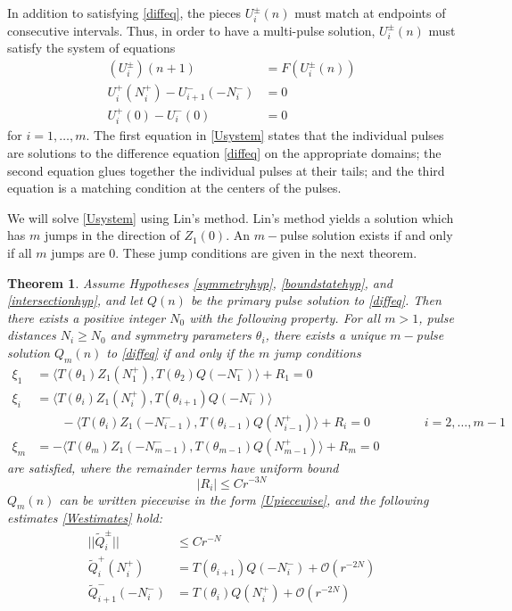 \documentclass[12pt]{article}
\newtheorem{theorem}{Theorem}
\begin{document}
In addition to satisfying \eqref{diffeq}, the pieces $U_i^\pm(n)$ must match at endpoints of consecutive intervals. Thus, in order to have a multi-pulse solution, $U_i^\pm(n)$ must satisfy the system of equations
\begin{equation}\label{Usystem}
\begin{aligned}
(U_i^\pm)(n+1) &= F(U_i^\pm(n))  \\
U_i^+(N_i^+) - U_{i+1}^-(-N_i^-) &= 0 \\
U_i^+(0) - U_i^-(0) &= 0
\end{aligned}
\end{equation}
for $i = 1, \dots, m$. The first equation in \eqref{Usystem} states that the individual pulses are solutions to the difference equation \eqref{diffeq} on the appropriate domains; the second equation glues together the individual pulses at their tails; and the third equation is a matching condition at the centers of the pulses.

We will solve \eqref{Usystem} using Lin's method. Lin's method yields a solution which has $m$ jumps in the direction of $Z_1(0)$. An $m-$pulse solution exists if and only if all $m$ jumps are 0. These jump conditions are given in the next theorem.

\begin{theorem}\label{ntmulti}
Assume Hypotheses \ref{symmetryhyp}, \ref{boundstatehyp}, and \ref{intersectionhyp}, and let $Q(n)$ be the primary pulse solution to \eqref{diffeq}. Then there exists a positive  integer $N_0$ with the following property. For all $m > 1$, pulse distances $N_i \geq N_0$ and symmetry parameters $\theta_i$, there exists a unique $m-$pulse solution $Q_m(n)$ to \eqref{diffeq} if and only if the $m$ jump conditions 
\begin{equation}\label{jumpcondexist}
\begin{aligned}
\xi_1 &= \langle T(\theta_1) Z_1(N_1^+), T(\theta_{2}) Q(-N_1^-) \rangle + R_1 = 0 \\
\xi_i &= \langle T(\theta_i) Z_1(N_i^+), T(\theta_{i+1}) Q(-N_i^-) \rangle \\
&\qquad-\langle T(\theta_i) Z_1(-N_{i-1}^-), T(\theta_{i-1}) Q(N_{i-1}^+) \rangle + R_i = 0 && \qquad i = 2, \dots, m-1 \\
\xi_m &= -\langle T(\theta_m) Z_1(-N_{m-1}^-), T(\theta_{m-1}) Q(N_{m-1}^+) \rangle + R_m = 0
\end{aligned}
\end{equation}
are satisfied, where the remainder terms have uniform bound
\[
|R_i| \leq C r^{-3N}
\]
$Q_m(n)$ can be written piecewise in the form \eqref{Upiecewise}, and the following estimates \eqref{Westimates} hold:
\begin{equation}\label{Westimates}
\begin{aligned}
||\tilde{Q}_i^\pm|| &\leq C r^{-N} \\
\tilde{Q}_i^+(N_i^+) &= T(\theta_{i+1}) Q(-N_i^-) + \mathcal{O}(r^{-2N}) \\
\tilde{Q}_{i+1}^-(-N_i^-) &= T(\theta_i) Q(N_i^+) + \mathcal{O}(r^{-2N})
\end{aligned}
\end{equation}
\end{theorem}
\end{document}
